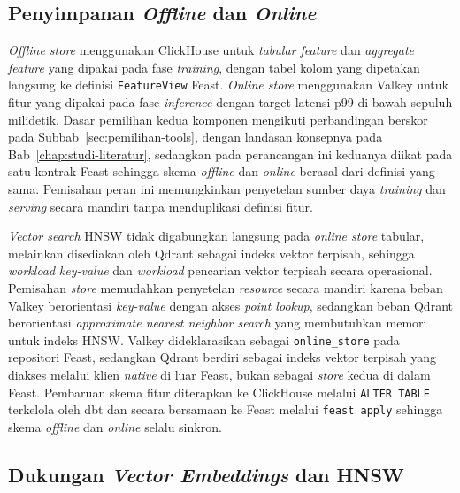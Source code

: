 \subsection{Penyimpanan \textit{Offline} dan \textit{Online}}
\label{subsec:offline-online}

\textit{Offline store} menggunakan ClickHouse untuk \textit{tabular feature} dan \textit{aggregate feature} yang dipakai pada fase \textit{training}, dengan tabel kolom yang dipetakan langsung ke definisi \texttt{FeatureView} Feast. \textit{Online store} menggunakan Valkey \autocite{valkey2025} untuk fitur yang dipakai pada fase \textit{inference} dengan target latensi p99 di bawah sepuluh milidetik. Dasar pemilihan kedua komponen mengikuti perbandingan berskor pada Subbab~\ref{sec:pemilihan-tools}, dengan landasan konsepnya pada Bab~\ref{chap:studi-literatur}, sedangkan pada perancangan ini keduanya diikat pada satu kontrak Feast sehingga skema \textit{offline} dan \textit{online} berasal dari definisi yang sama. Pemisahan peran ini memungkinkan penyetelan sumber daya \textit{training} dan \textit{serving} secara mandiri tanpa menduplikasi definisi fitur.

\textit{Vector search} HNSW tidak digabungkan langsung pada \textit{online store} tabular, melainkan disediakan oleh Qdrant \autocite{qdrant2025} sebagai indeks vektor terpisah, sehingga \textit{workload} \textit{key-value} dan \textit{workload} pencarian vektor terpisah secara operasional. Pemisahan \textit{store} memudahkan penyetelan \textit{resource} secara mandiri karena beban Valkey berorientasi \textit{key-value} dengan akses \textit{point lookup}, sedangkan beban Qdrant berorientasi \textit{approximate nearest neighbor search} yang membutuhkan memori untuk indeks HNSW. Valkey dideklarasikan sebagai \texttt{online\_store} pada repositori Feast, sedangkan Qdrant berdiri sebagai indeks vektor terpisah yang diakses melalui klien \textit{native} di luar Feast, bukan sebagai \textit{store} kedua di dalam Feast. Pembaruan skema fitur diterapkan ke ClickHouse melalui \texttt{ALTER TABLE} terkelola oleh dbt dan secara bersamaan ke Feast melalui \texttt{feast apply} sehingga skema \textit{offline} dan \textit{online} selalu sinkron.

\subsection{Dukungan \textit{Vector Embeddings} dan HNSW}
\label{subsec:vektor-embedding}

